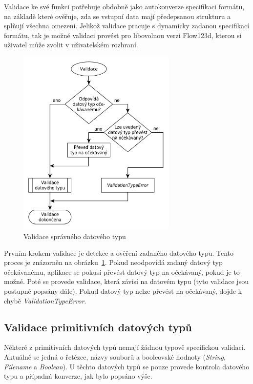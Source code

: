 \documentclass[FM,bw,DP]{tulthesis}
\begin{document}
Validace ke své funkci potřebuje obdobně jako autokonverze specifikaci formátu, na základě které ověřuje, zda se vstupní data mají předepsanou strukturu a splňují všechna omezení. Jelikož validace pracuje s dynamicky zadanou specifikací formátu, tak je možné validaci provést pro libovolnou verzi Flow123d, kterou si uživatel může zvolit v uživatelském rozhraní.

\begin{figure}[h]
	\centering
    \includegraphics[width=0.7\textwidth]{../img/validation_type.pdf}
    \caption{Validace správného datového typu}
	\label{img:validation_type}
\end{figure}

Prvním krokem validace je detekce a ověření zadaného datového typu. Tento proces je znázorněn na obrázku~\ref{img:validation_type}. Pokud neodpovídá zadaný datový typ očekávanému, aplikace se pokusí převést datový typ na očekávaný, pokud je to možné. Poté se provede validace, která závisí na datovém typu (tyto validace jsou postupně popsány dále). Pokud datový typ nelze převést na očekávaný, dojde k chybě \textit{ValidationTypeError}. 

\subsection{Validace primitivních datových typů}

Některé z primitivních datových typů nemají žádnou typově specifickou validaci. Aktuálně se jedná o řetězce, názvy souborů a booleovské hodnoty (\textit{String}, \textit{Filename} a \textit{Boolean}). U těchto datových typů se pouze provede kontrola datového typu a případná konverze, jak bylo popsáno výše.
\end{document}
